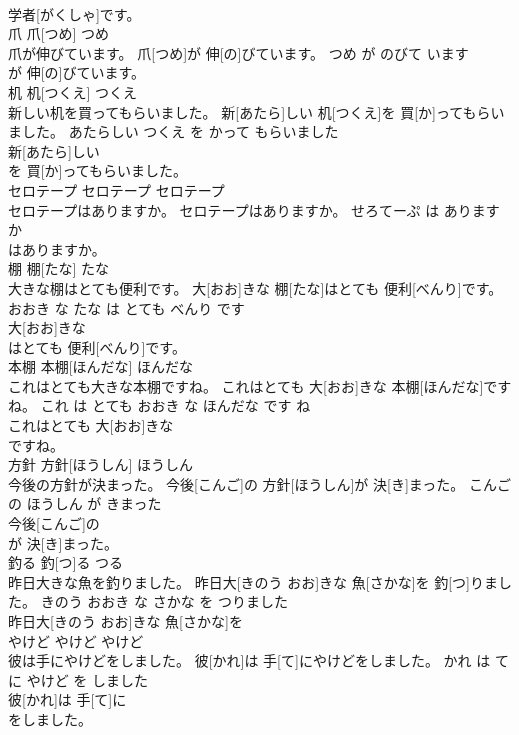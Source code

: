 \documentclass[8pt]{extreport}
\begin{document}
\begin{CJK}{UTF8}{min}
\\	学者[がくしゃ]です。		
\\	爪	爪[つめ]	つめ	
\\	爪が伸びています。	爪[つめ]が 伸[の]びています。	つめ が のびて います	
\\	が 伸[の]びています。		
\\	机	机[つくえ]	つくえ	
\\	新しい机を買ってもらいました。	新[あたら]しい 机[つくえ]を 買[か]ってもらいました。	あたらしい つくえ を かって もらいました	
\\	新[あたら]しい
\\	を 買[か]ってもらいました。		
\\	セロテープ	セロテープ	セロテープ	
\\	セロテープはありますか。	セロテープはありますか。	せろてーぷ は あります か	
\\	はありますか。		
\\	棚	棚[たな]	たな	
\\	大きな棚はとても便利です。	大[おお]きな 棚[たな]はとても 便利[べんり]です。	おおき な たな は とても べんり です	
\\	大[おお]きな
\\	はとても 便利[べんり]です。		
\\	本棚	本棚[ほんだな]	ほんだな	
\\	これはとても大きな本棚ですね。	これはとても 大[おお]きな 本棚[ほんだな]ですね。	これ は とても おおき な ほんだな です ね	
\\	これはとても 大[おお]きな
\\	ですね。		
\\	方針	方針[ほうしん]	ほうしん	
\\	今後の方針が決まった。	今後[こんご]の 方針[ほうしん]が 決[き]まった。	こんご の ほうしん が きまった	
\\	今後[こんご]の
\\	が 決[き]まった。		
\\	釣る	釣[つ]る	つる	
\\	昨日大きな魚を釣りました。	昨日大[きのう おお]きな 魚[さかな]を 釣[つ]りました。	きのう おおき な さかな を つりました	
\\	昨日大[きのう おお]きな 魚[さかな]を
\\	やけど	やけど	やけど	
\\	彼は手にやけどをしました。	彼[かれ]は 手[て]にやけどをしました。	かれ は て に やけど を しました	
\\	彼[かれ]は 手[て]に
\\	をしました。		

\end{CJK}
\end{document}
